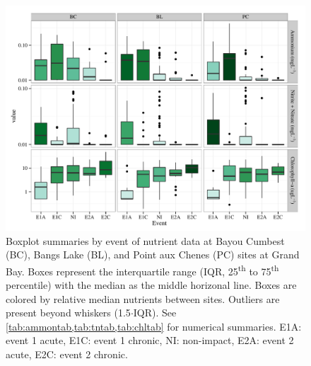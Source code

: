 \documentclass[letterpaper,12pt]{article}\usepackage[]{graphicx}\usepackage[]{color}
\makeatletter
\def\maxwidth{ %
  \ifdim\Gin@nat@width>\linewidth
    \linewidth
  \else
    \Gin@nat@width
  \fi
}
\makeatother
\begin{document}
\begin{figure}[!ht]

{\centering \includegraphics[width=\maxwidth]{figs/boxplt_all-1} 

}

\caption{Boxplot summaries by event of nutrient data at Bayou Cumbest (BC), Bangs Lake (BL), and Point aux Chenes (PC) sites at Grand Bay.  Boxes represent the interquartile range (IQR, 25\textsuperscript{th} to 75\textsuperscript{th} percentile) with the median as the middle horizonal line.  Boxes are colored by relative median nutrients between sites.  Outliers are present beyond whiskers (1.5$\cdot$IQR). See \cref{tab:ammontab,tab:tntab,tab:chltab} for numerical summaries.  E1A: event 1 acute, E1C: event 1 chronic, NI: non-impact, E2A: event 2 acute, E2C: event 2 chronic.}\label{fig:boxplt_all}
\end{figure}


\clearpage
\end{document}
